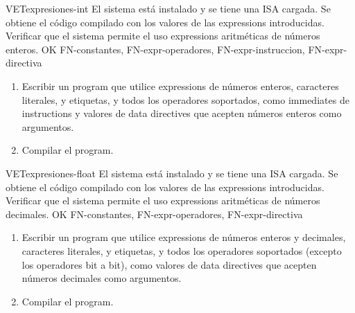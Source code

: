 \begin{testCase}{VET}{expresiones-int}
    {El sistema está instalado y se tiene una \gls{ISA} cargada.} %
    {Se obtiene el código compilado con los valores de las \glspl{expression} introducidas.} %
    {Verificar que el sistema permite el uso \glspl{expression} aritméticas de números enteros.} %
    {OK} %
    {FN-constantes, FN-expr-operadores, FN-expr-instruccion, FN-expr-directiva} %
    \begin{enumerate}[leftmargin=*, topsep=0pt, noitemsep] %
        \item Escribir un \gls{program} que utilice \glspl{expression} de
        números enteros, caracteres literales, y etiquetas, y todos los
        operadores soportados, como \glspl{immediate} de \glspl{instruction} y
        valores de \glspl{data directive} que acepten números enteros como
        argumentos.
        \item Compilar el \gls{program}.
    \end{enumerate}
\end{testCase}

\begin{testCase}{VET}{expresiones-float}
    {El sistema está instalado y se tiene una \gls{ISA} cargada.} %
    {Se obtiene el código compilado con los valores de las \glspl{expression} introducidas.} %
    {Verificar que el sistema permite el uso \glspl{expression} aritméticas de números decimales.} %
    {OK} %
    {FN-constantes, FN-expr-operadores, FN-expr-directiva} %
    \begin{enumerate}[leftmargin=*, topsep=0pt, noitemsep] %
        \item Escribir un \gls{program} que utilice \glspl{expression} de
        números enteros y decimales, caracteres literales, y etiquetas, y todos
        los operadores soportados (excepto los operadores bit a bit), como valores
        de \glspl{data directive} que acepten números decimales como argumentos.
        \item Compilar el \gls{program}.
    \end{enumerate}
\end{testCase}

